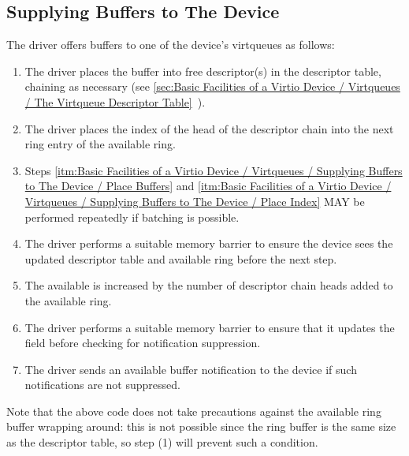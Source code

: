 \subsection{Supplying Buffers to The Device}\label{sec:Basic Facilities of a Virtio Device / Virtqueues / Supplying Buffers to The Device}

The driver offers buffers to one of the device's virtqueues as follows:

\begin{enumerate}
\item\label{itm:Basic Facilities of a Virtio Device / Virtqueues / Supplying Buffers to The Device / Place Buffers} The driver places the buffer into free descriptor(s) in the
   descriptor table, chaining as necessary (see \ref{sec:Basic Facilities of a Virtio Device / Virtqueues / The Virtqueue Descriptor Table}~).

\item\label{itm:Basic Facilities of a Virtio Device / Virtqueues / Supplying Buffers to The Device / Place Index} The driver places the index of the head of the descriptor chain
   into the next ring entry of the available ring.

\item Steps \ref{itm:Basic Facilities of a Virtio Device / Virtqueues / Supplying Buffers to The Device / Place Buffers} and \ref{itm:Basic Facilities of a Virtio Device / Virtqueues / Supplying Buffers to The Device / Place Index} MAY be performed repeatedly if batching
  is possible.

\item The driver performs a suitable memory barrier to ensure the device sees
  the updated descriptor table and available ring before the next
  step.

\item The available  is increased by the number of
  descriptor chain heads added to the available ring.

\item The driver performs a suitable memory barrier to ensure that it updates
  the  field before checking for notification suppression.

\item The driver sends an available buffer notification to the device if
    such notifications are not suppressed.
\end{enumerate}

Note that the above code does not take precautions against the
available ring buffer wrapping around: this is not possible since
the ring buffer is the same size as the descriptor table, so step
(1) will prevent such a condition.

